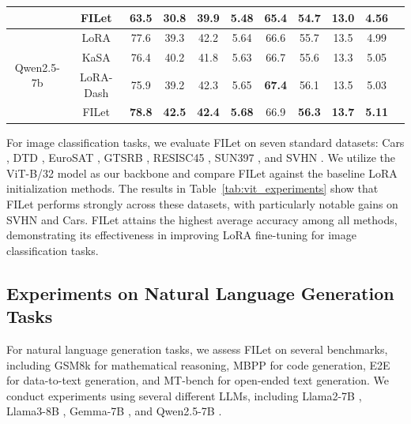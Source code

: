 \documentclass{article}
\theoremstyle{plain}
\theoremstyle{definition}
\theoremstyle{remark}
\begin{document}
\begin{table}[ht]
{\begin{tabular}{ccccccccccc}
    & FILet & \textbf{63.5} & \textbf{30.8} & \textbf{39.9} & \textbf{5.48} & 65.4 & \textbf{54.7} & \textbf{13.0} & \textbf{4.56} \\
    \hline
    \multirow{4}{*}{Qwen2.5-7b} & LoRA & 77.6 & 39.3 & 42.2 & 5.64 & 66.6 & 55.7 & 13.5 & 4.99\\
    & KaSA & 76.4 & 40.2 & 41.8 & 5.63 & 66.7 & 55.6 & 13.3 & 5.05\\
    & LoRA-Dash & 75.9 & 39.2 & 42.3 & 5.65 & \textbf{67.4} & 56.1 & 13.5 & 5.03 \\
    & FILet & \textbf{78.8} & \textbf{42.5} & \textbf{42.4} & \textbf{5.68} & 66.9 & \textbf{56.3} & \textbf{13.7} & \textbf{5.11} \\
    \hline
    \end{tabular}
  }
  
\end{table}

For image classification tasks, we evaluate FILet on seven standard datasets: Cars \cite{CARS}, DTD \cite{DTD}, EuroSAT \cite{EUROSAT}, GTSRB \cite{GTSRB}, RESISC45 \cite{RESISC45}, SUN397 \cite{SUN397}, and SVHN \cite{SVHN}. We utilize the ViT-B/32 \cite{VIT} model as our backbone and compare FILet against the baseline LoRA initialization methods. The results in Table~\ref{tab:vit_experiments} show that FILet performs strongly across these datasets, with particularly notable gains on SVHN and Cars. FILet attains the highest average accuracy among all methods, demonstrating its effectiveness in improving LoRA fine-tuning for image classification tasks. 




\subsection{Experiments on Natural Language Generation Tasks}
\label{subsec:nlg_experiments}





For natural language generation tasks, we assess FILet on several benchmarks, including GSM8k \cite{GSM8K} for mathematical reasoning, MBPP \cite{MBPP} for code generation, E2E \cite{E2E} for data-to-text generation, and MT-bench \cite{MTBENCH} for open-ended text generation. We conduct experiments using several different LLMs, including Llama2-7B \cite{LLAMA2}, Llama3-8B \cite{LLAMA3}, Gemma-7B \cite{GEMMA}, and Qwen2.5-7B \cite{QWEN25}. 
\end{document}
